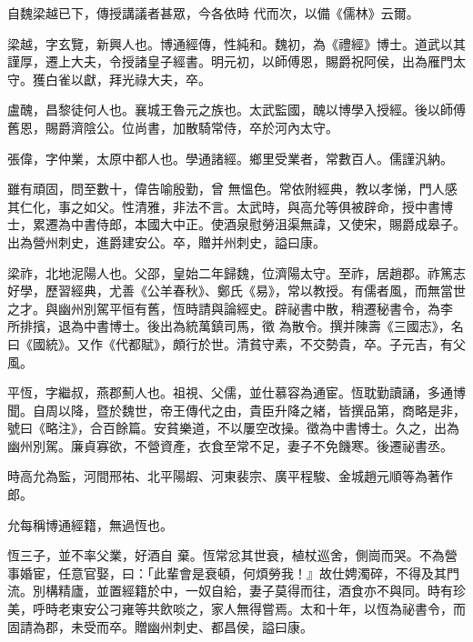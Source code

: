 \begin{pinyinscope}
 自魏梁越已下，傳授講議者甚眾，今各依時
 代而次，以備《儒林》云爾。



 梁越，字玄覽，新興人也。博通經傳，性純和。魏初，為《禮經》博士。道武以其謹厚，遷上大夫，令授諸皇子經書。明元初，以師傅恩，賜爵祝阿侯，出為雁門太守。獲白雀以獻，拜光祿大夫，卒。



 盧醜，昌黎徒何人也。襄城王魯元之族也。太武監國，醜以博學入授經。後以師傅舊恩，賜爵濟陰公。位尚書，加散騎常侍，卒於河內太守。



 張偉，字仲業，太原中都人也。學通諸經。鄉里受業者，常數百人。儒謹汎納。



 雖有頑固，問至數十，偉告喻殷勤，曾
 無慍色。常依附經典，教以孝悌，門人感其仁化，事之如父。性清雅，非法不言。太武時，與高允等俱被辟命，授中書博士，累遷為中書侍郎，本國大中正。使酒泉慰勞沮渠無諱，又使宋，賜爵成皋子。出為營州刺史，進爵建安公。卒，贈并州刺史，謚曰康。



 梁祚，北地泥陽人也。父邵，皇始二年歸魏，位濟陽太守。至祚，居趙郡。祚篤志好學，歷習經典，尤善《公羊春秋》、鄭氏《易》，常以教授。有儒者風，而無當世之才。與幽州別駕平恒有舊，恆時請與論經史。辟祕書中散，稍遷秘書令，為李所排擯，退為中書博士。後出為統萬鎮司馬，徵
 為散令。撰并陳壽《三國志》，名曰《國統》。又作《代都賦》，頗行於世。清貧守素，不交勢貴，卒。子元吉，有父風。



 平恆，字繼叔，燕郡薊人也。祖視、父儒，並仕慕容為通宦。恆耽勤讀誦，多通博聞。自周以降，暨於魏世，帝王傳代之由，貴臣升降之緒，皆撰品第，商略是非，號曰《略注》，合百餘篇。安貧樂道，不以屢空改操。徵為中書博士。久之，出為幽州別駕。廉貞寡欲，不營資產，衣食至常不足，妻子不免饑寒。後遷祕書丞。



 時高允為監，河間邢祐、北平陽嘏、河東裴宗、廣平程駿、金城趙元順等為著作郎。



 允每稱博通經籍，無過恆也。



 恆三子，並不率父業，好酒自
 棄。恆常忿其世衰，植杖巡舍，側崗而哭。不為營事婚宦，任意官娶，曰：「此輩會是衰頓，何煩勞我！』故仕娉濁碎，不得及其門流。別構精廬，並置經籍於中，一奴自給，妻子莫得而往，酒食亦不與同。時有珍美，呼時老東安公刁雍等共飲啖之，家人無得嘗焉。太和十年，以恆為祕書令，而固請為郡，未受而卒。贈幽州刺史、都昌侯，謚曰康。




\end{pinyinscope}
